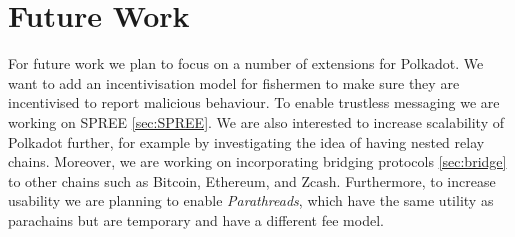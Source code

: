 









\section{Future Work}
For future work we plan to focus on a number of extensions for Polkadot.
We want to add an incentivisation model for fishermen to make sure they are incentivised to report malicious behaviour. 
To enable trustless messaging we are working on SPREE \ref{sec:SPREE}. We are also interested to increase scalability of Polkadot further, for example by investigating the idea of having nested relay chains. Moreover, we are working on incorporating bridging protocols \ref{sec:bridge} to other chains  such as Bitcoin, Ethereum, and Zcash. Furthermore, to increase usability we are planning to enable \emph{Parathreads}, which have the same utility as parachains but are temporary and have a different fee model.




